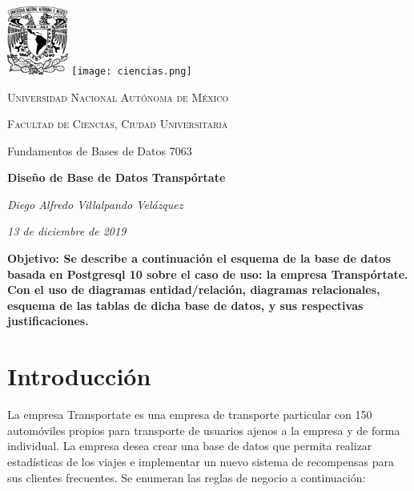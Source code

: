 \documentclass{article}
\begin{document}

{\centering 
\noindent\hrulefill \par \vspace{0.5cm}
\includegraphics[width=2cm]{unam.png} \hspace{11.5cm}
\texttt{[image: ciencias.png]}\vspace{-2.2cm}
     {\scshape\Large Universidad Nacional Autónoma de México \par}
     {\scshape\Large Facultad de Ciencias, Ciudad Universitaria \par}
     {\Large Fundamentos de Bases de Datos 7063\par}
     \vspace{0.2cm}
     {\Large\bfseries Diseño de Base de Datos Transpórtate \par}
     \vspace{0.2cm}
     {\large\itshape Diego Alfredo Villalpando Velázquez \par \vspace{0.2cm}}
     {\large\itshape 13 de diciembre de 2019\par} \vspace{0.35cm}
     \noindent\hrulefill
}

\vspace{0.5cm}
       { \bfseries
         Objetivo:
         Se describe a continuación el esquema de la base de datos basada en Postgresql 10
         sobre el caso de uso: la empresa Transpórtate. Con el uso de diagramas
         entidad/relación, diagramas relacionales, esquema de las tablas de dicha base de
         datos, y sus respectivas justificaciones.
       }
       
       \noindent \tableofcontents

       \newpage
       \section{Introducción}
       {
         La empresa Transportate es una empresa de transporte particular con 150 automóviles
         propios para transporte de usuarios ajenos a la empresa y de forma individual. La
         empresa desea crear una base de datos que permita realizar estadísticas
         de los viajes e implementar un nuevo sistema de recompensas para sus clientes
         frecuentes. Se enumeran las reglas de negocio a continuación:
       }
\end{document}
